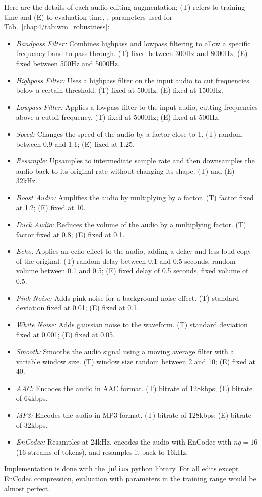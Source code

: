 Here are the details of each audio editing augmentation; 
(T) refers to training time and (E) to evaluation time, \ie, parameters used for Tab.~\ref{chap4/tab:wm_robustness}:
\begin{itemize}[leftmargin=2em]
    \item \emph{Bandpass Filter:} Combines highpass and lowpass filtering to allow a specific frequency band to pass through.
    (T) fixed between 300Hz and 8000Hz; (E) fixed between 500Hz and 5000Hz.
    \item \emph{Highpass Filter:} Uses a highpass filter on the input audio to cut frequencies below a certain threshold.
    (T) fixed at 500Hz; (E) fixed at 1500Hz.
    \item \emph{Lowpass Filter:} Applies a lowpass filter to the input audio, cutting frequencies above a cutoff frequency.
    (T) fixed at 5000Hz; (E) fixed at 500Hz.
    \item \emph{Speed:} Changes the speed of the audio by a factor close to 1. 
    (T) random between 0.9 and 1.1; (E) fixed at 1.25.
    \item \emph{Resample:} Upsamples to intermediate sample rate and then downsamples the audio back to its original rate without changing its shape.
    (T) and (E) 32kHz.
    \item \emph{Boost Audio:} Amplifies the audio by multiplying by a factor.
    (T) factor fixed at 1.2; (E) fixed at 10.
    \item \emph{Duck Audio:} Reduces the volume of the audio by a multiplying factor.
    (T) factor fixed at 0.8; (E) fixed at 0.1.
    \item \emph{Echo:} Applies an echo effect to the audio, adding a delay and less loud copy of the original.
    (T) random delay between 0.1 and 0.5 seconds, random volume between 0.1 and 0.5; (E) fixed delay of 0.5 seconds, fixed volume of 0.5.
    \item \emph{Pink Noise:} Adds pink noise for a background noise effect.
    (T) standard deviation fixed at 0.01; (E) fixed at 0.1.
    \item \emph{White Noise:} Adds gaussian noise to the waveform.
    (T) standard deviation fixed at 0.001; (E) fixed at 0.05.
    \item \emph{Smooth:} Smooths the audio signal using a moving average filter with a variable window size.
    (T) window size random between 2 and 10; (E) fixed at 40.
    \item \emph{AAC:} Encodes the audio in AAC format.
    (T) bitrate of 128kbps; (E) bitrate of 64kbps.
    \item \emph{MP3:} Encodes the audio in MP3 format.
    (T) bitrate of 128kbps; (E) bitrate of 32kbps.
    \item \emph{EnCodec:} Resamples at 24kHz, encodes the audio with EnCodec with $nq=16$ (16 streams of tokens), and resamples it back to 16kHz.
\end{itemize}
Implementation is done with the \texttt{julius} python library. 
For all edits except EnCodec compression, evaluation with parameters in the training range would be almost perfect.
